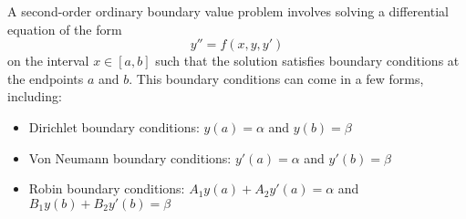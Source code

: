 \documentclass[11pt, a4paper]{article}
\newcommand{\schro}{Schr\"{o}dinger\xspace}
\begin{document}
\vspace{2mm}

\iffalse
We will solve the stationary \schro equation
\begin{equation*}
	- \frac{\hbar^{2}}{2m} \dv[2]{\psi}{x} + V(x) \psi = E\psi
\end{equation*}
for an infinite potential well:
\begin{equation*}
	V(x) = 
	\begin{cases}
		0 & -\frac{a}{2} < x < \frac{a}{2}\\
		\infty & \abs{x} \geq \frac{a}{2}
	\end{cases}
\end{equation*}
and for a finite potential well 
\begin{equation*}
	V(x) = 
	\begin{cases}
		0 & -\frac{a}{2} < x < \frac{a}{2}\\
		V_{0} & \abs{x} \geq \frac{a}{2}
	\end{cases}
\end{equation*}
The analytic solutions are: \textbf{TODO}.

\fi


A second-order ordinary boundary value problem involves solving a differential equation of the form
\begin{equation*}
	y'' = f(x, y, y')
\end{equation*}
on the interval $ x \in [a, b] $ such that the solution satisfies boundary conditions at the endpoints $ a $ and $ b $. This boundary conditions can come in a few forms, including:
\begin{itemize}
	\item Dirichlet boundary conditions: $ y(a) = \alpha $ and $ y(b) = \beta $
	\item Von Neumann boundary conditions: $ y'(a) = \alpha $ and $ y'(b) = \beta $
	\item Robin boundary conditions: $ A_{1}y(a) + A_{2}y'(a) = \alpha $ and $ B_{1}y(b) + B_{2}y'(b) = \beta $
\end{itemize}
\end{document}
